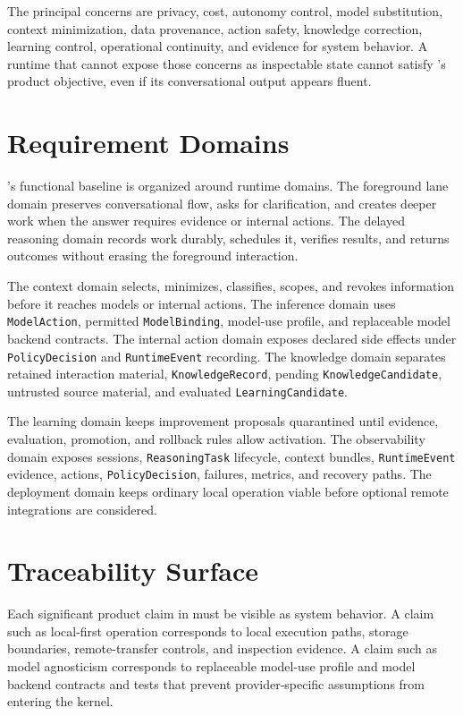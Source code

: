 \documentclass[11pt]{report}
\begin{document}
The principal concerns are privacy, cost, autonomy control, model substitution, context minimization, data provenance, action safety, knowledge correction, learning control, operational continuity, and evidence for system behavior. A runtime that cannot expose those concerns as inspectable state cannot satisfy \Madre's product objective, even if its conversational output appears fluent.

\section{Requirement Domains}

\Madre's functional baseline is organized around runtime domains. The foreground lane domain preserves conversational flow, asks for clarification, and creates deeper work when the answer requires evidence or internal actions. The delayed reasoning domain records work durably, schedules it, verifies results, and returns outcomes without erasing the foreground interaction.

The context domain selects, minimizes, classifies, scopes, and revokes information before it reaches models or internal actions. The inference domain uses \texttt{ModelAction}, permitted \texttt{ModelBinding}, model-use profile, and replaceable model backend contracts. The internal action domain exposes declared side effects under \texttt{PolicyDecision} and \texttt{RuntimeEvent} recording. The knowledge domain separates retained interaction material, \texttt{KnowledgeRecord}, pending \texttt{KnowledgeCandidate}, untrusted source material, and evaluated \texttt{LearningCandidate}.

The learning domain keeps improvement proposals quarantined until evidence, evaluation, promotion, and rollback rules allow activation. The observability domain exposes sessions, \texttt{ReasoningTask} lifecycle, context bundles, \texttt{RuntimeEvent} evidence, actions, \texttt{PolicyDecision}, failures, metrics, and recovery paths.
The deployment domain keeps ordinary local operation viable before optional remote integrations are considered.

\section{Traceability Surface}

Each significant product claim in \Madre must be visible as system behavior. A claim such as local-first operation corresponds to local execution paths, storage boundaries, remote-transfer controls, and inspection evidence. A claim such as model agnosticism corresponds to replaceable model-use profile and model backend contracts and tests that prevent provider-specific assumptions from entering the kernel.
\end{document}
